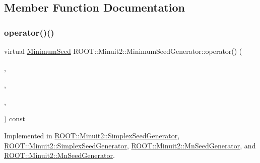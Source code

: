 \subsection{Member Function Documentation}
\mbox{\label{classROOT_1_1Minuit2_1_1MinimumSeedGenerator_ae71de52027d3f0c7fa202c7cf65b947a}} 
\subsubsection{\texorpdfstring{operator()()}{operator()()}\hspace{0.1cm}{\footnotesize\ttfamily [1/4]}}
{\footnotesize\ttfamily virtual \mbox{\hyperlink{classROOT_1_1Minuit2_1_1MinimumSeed}{Minimum\+Seed}} R\+O\+O\+T\+::\+Minuit2\+::\+Minimum\+Seed\+Generator\+::operator() (\begin{DoxyParamCaption}\item[{const \mbox{\hyperlink{classROOT_1_1Minuit2_1_1MnFcn}{Mn\+Fcn}} \&}]{,  }\item[{const \mbox{\hyperlink{classROOT_1_1Minuit2_1_1GradientCalculator}{Gradient\+Calculator}} \&}]{,  }\item[{const \mbox{\hyperlink{classROOT_1_1Minuit2_1_1MnUserParameterState}{Mn\+User\+Parameter\+State}} \&}]{,  }\item[{const \mbox{\hyperlink{classROOT_1_1Minuit2_1_1MnStrategy}{Mn\+Strategy}} \&}]{ }\end{DoxyParamCaption}) const\hspace{0.3cm}{\ttfamily [pure virtual]}}



Implemented in \mbox{\hyperlink{classROOT_1_1Minuit2_1_1SimplexSeedGenerator_aa0c427acb85f9a47a0abaecbf85b1f5c}{R\+O\+O\+T\+::\+Minuit2\+::\+Simplex\+Seed\+Generator}}, \mbox{\hyperlink{classROOT_1_1Minuit2_1_1SimplexSeedGenerator_a48f1bb260753e6c6f053072d4754a028}{R\+O\+O\+T\+::\+Minuit2\+::\+Simplex\+Seed\+Generator}}, \mbox{\hyperlink{classROOT_1_1Minuit2_1_1MnSeedGenerator_a654d0f1b67cd1a3a17de8334ba811ef0}{R\+O\+O\+T\+::\+Minuit2\+::\+Mn\+Seed\+Generator}}, and \mbox{\hyperlink{classROOT_1_1Minuit2_1_1MnSeedGenerator_a1c06ece239f548163beb232600dc8cc3}{R\+O\+O\+T\+::\+Minuit2\+::\+Mn\+Seed\+Generator}}.

\mbox{\label{classROOT_1_1Minuit2_1_1MinimumSeedGenerator_ae71de52027d3f0c7fa202c7cf65b947a}} 
